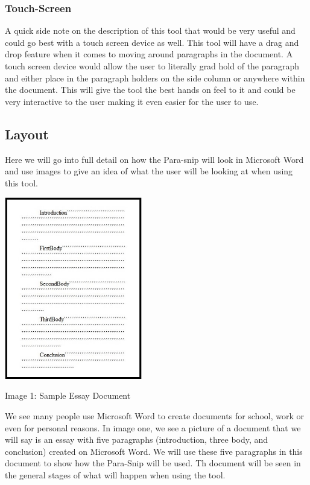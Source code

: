 \documentclass{article}
\begin{document}
{\subsubsection{Touch-Screen}
	A quick side note on the description of this tool that would be very useful and could go best with a touch screen device as well. This tool will have a drag and drop feature when it comes to moving around paragraphs in the document. A touch screen device would allow the user to literally grad hold of the paragraph and either place in the paragraph holders on the side column or anywhere within the document. This will give the tool the best hands on feel to it and could be very interactive to the user making it even easier for the user to use.
	
\subsection{Layout}
	Here we will go into full detail on how the Para-snip will look in Microsoft Word and use images to give an idea of what the user will be looking at when using this tool.

\begin{center}
\includegraphics[width=60mm]{BeginEssay.jpg}
\end{center}
\begin{center}
Image 1: Sample Essay Document
\end{center}
	
	We see many people use Microsoft Word to create documents for school, work or even for personal reasons. In image one, we see a picture of a document that we will say is an essay with five paragraphs (introduction, three body, and conclusion) created on Microsoft Word. We will use these five paragraphs in this document to show how the Para-Snip will be used. Th document will be seen in the general stages of what will happen when using the tool.
	
}
\end{document}
